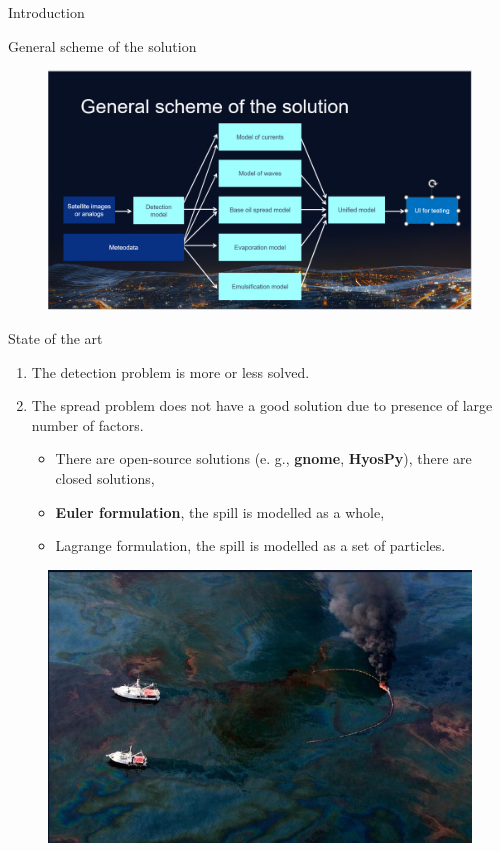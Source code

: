 \documentclass{beamer}
\begin{document}
\begin{section}{Introduction}
\begin{frame}{General scheme of the solution}

\begin{figure}[H]
	\centering
	\includegraphics[scale=0.4]{general_scheme_of_the_solution_eng.png}
\end{figure}
	
\end{frame}

\begin{frame}{State of the art}
		
\begin{enumerate}
	\item The detection problem is more or less solved.
	\item The spread problem does not have a good solution due to presence of large number of factors.
	\begin{itemize}
		\item There are open-source solutions (e. g., \textbf{gnome}, \textbf{HyosPy}), there are closed solutions,
		\item \textbf{Euler formulation}, the spill is modelled as a whole,
		\item Lagrange formulation, the spill is modelled as a set of particles.
	\end{itemize}
\end{enumerate}

\begin{figure}[H]
	\centering
	\includegraphics[scale=0.25]{example_oil.png}
\end{figure}
		

\end{frame}
\end{section}
\end{document}
